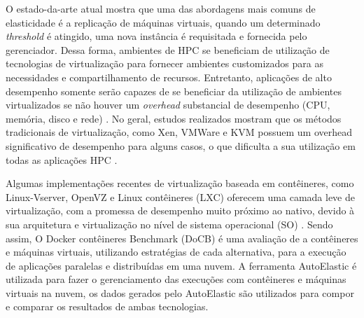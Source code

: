 \documentclass[twoside,english,brazilian]{UNISINOSartigo}
\begin{document}
O estado-da-arte atual mostra que uma das abordagens mais comuns de elasticidade é a replicação de máquinas virtuais, quando um determinado \textit{threshold} é atingido, uma nova instância é requisitada e fornecida pelo gerenciador. Dessa forma, ambientes de HPC se beneficiam de utilização de tecnologias de virtualização para fornecer ambientes customizados para as necessidades e compartilhamento de recursos. Entretanto, aplicações de alto desempenho somente serão capazes de se beneficiar da utilização de ambientes virtualizados se não houver um \textit{overhead} substancial de desempenho (CPU, memória, disco e rede) \cite{Xavier2013}. No geral, estudos realizados mostram que os métodos tradicionais de virtualização, como Xen, VMWare e KVM possuem um overhead significativo de desempenho para alguns casos, o que dificulta a sua utilização em todas as aplicações HPC \cite{Zheng2017}. 

Algumas implementações recentes de virtualização baseada em contêineres, como Linux-Vserver, OpenVZ e Linux contêineres (LXC) oferecem uma camada leve de virtualização, com a promessa de desempenho muito próximo ao nativo, devido à sua arquitetura e virtualização no nível de sistema operacional (SO) \cite{Bernstein2014}. Sendo assim, O Docker contêineres Benchmark (DoCB) é uma avaliação de a contêineres e máquinas virtuais, utilizando estratégias de cada alternativa, para a execução de aplicações paralelas e distribuídas em uma nuvem. A ferramenta AutoElastic é utilizada para fazer o gerenciamento das execuções com contêineres e máquinas virtuais na nuvem, os dados gerados pelo AutoElastic são utilizados para compor e comparar os resultados de ambas tecnologias. 
\end{document}
